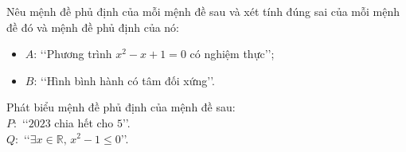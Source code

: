 \begin{bt}%
	Nêu mệnh đề phủ định của mỗi mệnh đề sau và xét tính đúng sai của mỗi mệnh đề đó và mệnh đề phủ định của nó:
	\begin{itemize}
		\item[a)] $A$: \lq\lq Phương trình $x^2-x+1=0$ có nghiệm thực\rq\rq;
		\item[b)] $B$: \lq\lq Hình bình hành có tâm đối xứng\rq\rq.
	\end{itemize}
\end{bt}

\begin{bt}%
	Phát biểu mệnh đề phủ định của mệnh đề sau:\\
	$P\colon$ \lq\lq $2023$ chia hết cho $5$\rq\rq.\\
	$Q\colon$ \lq\lq $\exists x\in \mathbb{R},\, x^2-1\le 0$\rq\rq.\\
\end{bt}

